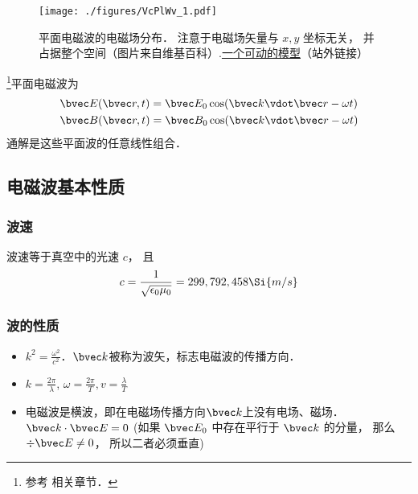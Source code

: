 

\begin{figure}[ht]
\centering
\texttt{[image: ./figures/VcPlWv\_1.pdf]}
\caption{平面电磁波的电磁场分布． 注意于电磁场矢量与 $x, y$ 坐标无关， 并占据整个空间（图片来自维基百科）.\href{https://www.geogebra.org/m/xhYwXSsH}{一个可动的模型}（站外链接）} \label{VcPlWv_fig1}
\end{figure}

\footnote{参考 \cite{GriffE} 相关章节．}平面电磁波为
\begin{align}
&\bvec E(\bvec r, t) = \bvec E_0 \cos(\bvec k\vdot \bvec r - \omega t)\\
&\bvec B(\bvec r, t) = \bvec B_0 \cos(\bvec k \vdot \bvec r - \omega t)
\end{align}
通解是这些平面波的任意线性组合． 

\subsection{电磁波基本性质}
\subsubsection{波速}
波速等于真空中的光速 $c$， 且
\begin{equation}\label{VcPlWv_eq1}
c = \frac{1}{\sqrt{\epsilon_0\mu_0}} = 299,792,458 \Si{m/s}
\end{equation}

\subsubsection{波的性质}
\begin{itemize}
\item  $k^2=\frac{\omega^2}{c^2}$．$\bvec k$被称为波矢，标志电磁波的传播方向．
\item $k=\frac{2\pi}{\lambda}$, $\omega=\frac{2\pi}{T}, v=\frac{\lambda}{T}$
\item 电磁波是横波，即在电磁场传播方向$\bvec k$上没有电场、磁场．$\bvec k \cdot \bvec E = 0$ (如果 $\bvec E_0$ 中存在平行于 $\bvec k$ 的分量， 那么 $\div \bvec E \ne 0$， 所以二者必须垂直)
\end{itemize}



